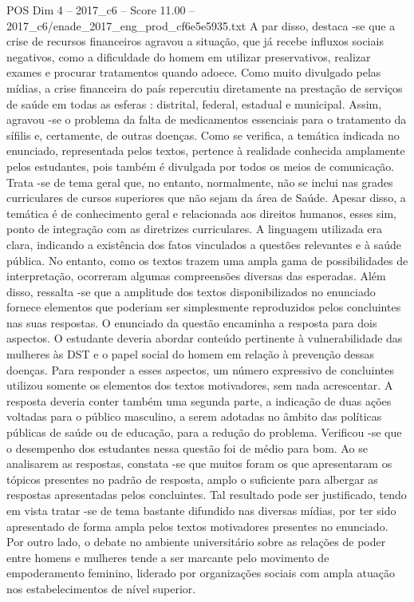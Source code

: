 \begin{textsample}{POS Dim 4 – 2017\_c6 – Score 11.00 – 2017\_c6/enade\_2017\_eng\_prod\_cf6e5e5935.txt}
A par disso, destaca -se que a crise de recursos financeiros agravou a situação, que já recebe influxos sociais negativos, como a dificuldade do homem em utilizar preservativos, realizar exames e procurar tratamentos quando adoece.
Como muito divulgado pelas mídias, a crise financeira do país repercutiu diretamente na prestação de serviços de saúde em todas as esferas : distrital, federal, estadual e municipal.
Assim, agravou -se o problema da falta de medicamentos essenciais para o tratamento da sífilis e, certamente, de outras doenças.
Como se verifica, a temática indicada no enunciado, representada pelos textos, pertence à realidade conhecida amplamente pelos estudantes, pois também é divulgada por todos os meios de comunicação.
Trata -se de tema geral que, no entanto, normalmente, não se inclui nas grades curriculares de cursos superiores que não sejam da área de Saúde.
Apesar disso, a temática é de conhecimento geral e relacionada aos direitos humanos, esses sim, ponto de integração com as diretrizes curriculares.
A linguagem utilizada era clara, indicando a existência dos fatos vinculados a questões relevantes e à saúde pública.
No entanto, como os textos trazem uma ampla gama de possibilidades de interpretação, ocorreram algumas compreensões diversas das esperadas.
Além disso, ressalta -se que a amplitude dos textos disponibilizados no enunciado fornece elementos que poderiam ser simplesmente reproduzidos pelos concluintes nas suas respostas.
O enunciado da questão encaminha a resposta para dois aspectos.
O estudante deveria abordar conteúdo pertinente à vulnerabilidade das mulheres às DST e o papel social do homem em relação à prevenção dessas doenças.
Para responder a esses aspectos, um número expressivo de concluintes utilizou somente os elementos dos textos motivadores, sem nada acrescentar.
A resposta deveria conter também uma segunda parte, a indicação de duas ações voltadas para o público masculino, a serem adotadas no âmbito das políticas públicas de saúde ou de educação, para a redução do problema.
Verificou -se que o desempenho dos estudantes nessa questão foi de médio para bom.
Ao se analisarem as respostas, constata -se que muitos foram os que apresentaram os tópicos presentes no padrão de resposta, amplo o suficiente para albergar as respostas apresentadas pelos concluintes.
Tal resultado pode ser justificado, tendo em vista tratar -se de tema bastante difundido nas diversas mídias, por ter sido apresentado de forma ampla pelos textos motivadores presentes no enunciado.
Por outro lado, o debate no ambiente universitário sobre as relações de poder entre homens e mulheres tende a ser marcante pelo movimento de empoderamento feminino, liderado por organizações sociais com ampla atuação nos estabelecimentos de nível superior.

\end{textsample}
